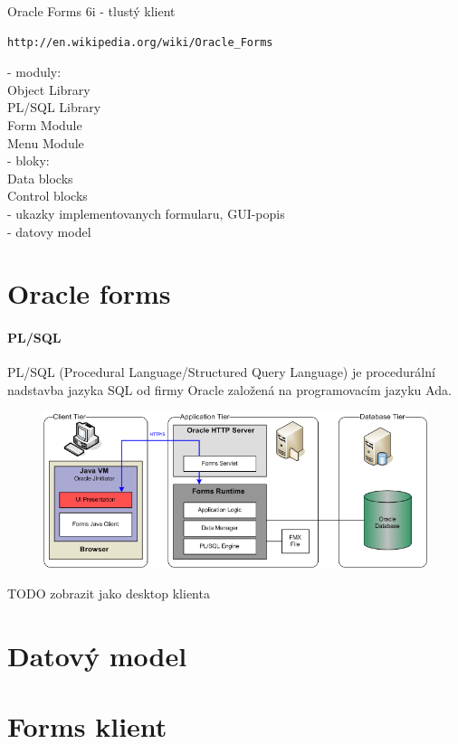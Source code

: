 \documentclass{bakalarka}
\begin{document}
Oracle Forms 6i - tlustý klient \\
\begin{verbatim}
http://en.wikipedia.org/wiki/Oracle_Forms
\end{verbatim}

- moduly:\\
Object Library\\
PL/SQL Library  \\
Form Module   \\
Menu Module\\
- bloky:\\
Data blocks\\
Control blocks\\

- ukazky implementovanych formularu, GUI-popis\\
- datovy model\\

\section{Oracle forms}

\paragraph{PL/SQL}
PL/SQL (Procedural Language/Structured Query Language) je procedurální nadstavba jazyka SQL od firmy Oracle založená na programovacím jazyku Ada.
\begin{figure}[H]
  \centering
  \includegraphics[scale=0.55]{obr/3tier.png}
  \label{}
\end{figure}
TODO zobrazit jako desktop klienta
\section{Datový model}

\section{Forms klient}
\end{document}
